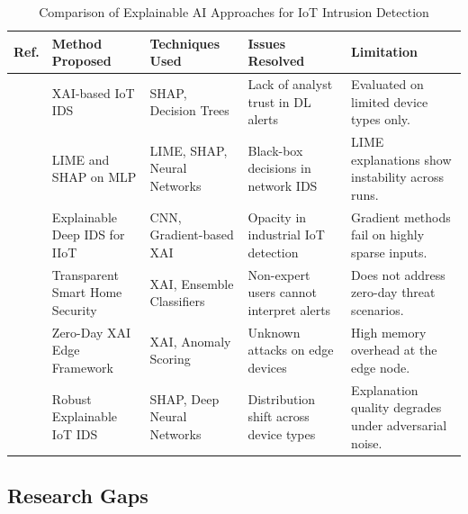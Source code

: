 \documentclass[a4paper,fleqn]{cas-dc}
\numberwithin{equation}{section}
\begin{document}
\begin{table}[width=.9\textwidth,cols=5,pos=h]
\caption{Comparison of Explainable AI Approaches for IoT Intrusion Detection}
\label{tab:literature_summary}
\begin{tabular*}{\textwidth}{@{\extracolsep{\fill}} p{} p{} p{} p{} p{}}
\toprule
\textbf{Ref.} & \textbf{Method Proposed} & \textbf{Techniques Used} & \textbf{Issues Resolved} & \textbf{Limitation} \\
\midrule

\cite{siganos2023explainable} &
XAI-based IoT IDS &
SHAP, Decision Trees &
Lack of analyst trust in DL alerts &
Evaluated on limited device types only. \\
\addlinespace

\cite{ieee2024limeshap} &
LIME and SHAP on MLP &
LIME, SHAP, Neural Networks &
Black-box decisions in network IDS &
LIME explanations show instability across runs. \\
\addlinespace

\cite{saheed2022explainable} &
Explainable Deep IDS for IIoT &
CNN, Gradient-based XAI &
Opacity in industrial IoT detection &
Gradient methods fail on highly sparse inputs. \\
\addlinespace

\cite{zolanvari2021transparent} &
Transparent Smart Home Security &
XAI, Ensemble Classifiers &
Non-expert users cannot interpret alerts &
Does not address zero-day threat scenarios. \\
\addlinespace

\cite{aspg2025zeroday} &
Zero-Day XAI Edge Framework &
XAI, Anomaly Scoring &
Unknown attacks on edge devices &
High memory overhead at the edge node. \\
\addlinespace

\cite{islam2023robust} &
Robust Explainable IoT IDS &
SHAP, Deep Neural Networks &
Distribution shift across device types &
Explanation quality degrades under adversarial noise. \\

\bottomrule
\end{tabular*}
\end{table}

\subsection{Research Gaps}
\end{document}
